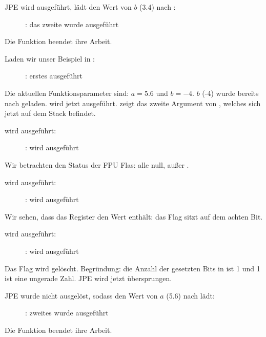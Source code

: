 \clearpage
\ac{JPE} wird ausgeführt, \FLD lädt den Wert von $b$ (3.4) nach :

\begin{figure}[H]
\centering
{}
\caption{\olly: das zweite \FLD wurde ausgeführt}
\label{fig:FPU_comparison_case1_olly5}
\end{figure}

Die Funktion beendet ihre Arbeit.

\clearpage
{}

Laden wir unser Beispiel in \olly:

\begin{figure}[H]
\centering
{}
\caption{\olly: erstes \FLD ausgeführt}
\label{fig:FPU_comparison_case2_olly1}
\end{figure}
Die aktuellen Funktionsparameter sind: $a=5.6$ und $b=-4$.
$b$ (-4) wurde bereits nach  geladen.
\FCOMP wird jetzt ausgeführt.
\olly zeigt das zweite Argument von \FCOMP, welches sich jetzt auf dem Stack
befindet.

\clearpage
\FCOMP wird ausgeführt:

\begin{figure}[H]
\centering
{}
\caption{\olly: \FCOMP wird ausgeführt}
\label{fig:FPU_comparison_case2_olly2}
\end{figure}
Wir betrachten den Status der \ac{FPU} Flas: alle null, außer \Czero.

\clearpage
\FNSTSW wird ausgeführt:

\begin{figure}[H]
\centering
{}
\caption{\olly: \FNSTSW wird ausgeführt}
\label{fig:FPU_comparison_case2_olly3}
\end{figure}
Wir sehen, dass das  Register den Wert  enthält: das \Czero
Flag sitzt auf dem achten Bit.

\clearpage
\TEST wird ausgeführt:

\begin{figure}[H]
\centering
{}
\caption{\olly: \TEST wird ausgeführt}
\label{fig:FPU_comparison_case2_olly4}
\end{figure}

Das   Flag wird gelöscht. 
Begründung: die Anzahl der gesetzten Bits in  ist 1 und 1 ist eine
ungerade Zahl. \ac{JPE} wird jetzt übersprungen.

\clearpage
\ac{JPE} wurde nicht ausgelöst, sodass \FLD den Wert von $a$ (5.6) nach
 lädt:

\begin{figure}[H]
\centering
{}
\caption{\olly: zweites \FLD wurde ausgeführt}
\label{fig:FPU_comparison_case2_olly5}
\end{figure}

Die Funktion beendet ihre Arbeit.
